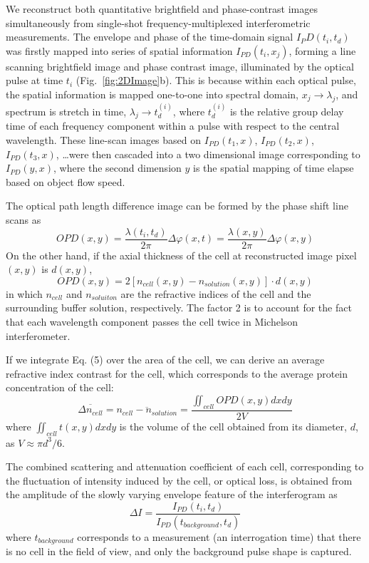\documentclass[aps,pra,reprint,superscriptaddress]{revtex4-1}
\begin{document}
We reconstruct both quantitative brightfield and phase-contrast images simultaneously from single-shot frequency-multiplexed interferometric measurements. The envelope and phase of the time-domain signal $I_PD (t_i,t_d)$ was firstly mapped into series of spatial information $I_{PD}(t_i,x_j)$, forming a line scanning brightfield image and phase contrast image, illuminated by the optical pulse at time $t_i$ (Fig.~\ref{fig:2DImage}b). This is because within each optical pulse, the spatial information is mapped one-to-one into spectral domain, $x_j \rightarrow \lambda_j$, and spectrum is stretch in time, $\lambda_j \rightarrow t_d^{(i)}$, where $t_d^{(i)}$ is the relative group delay time of each frequency component within a pulse with respect to the central wavelength. These line-scan images based on $I_{PD}(t_1,x)$, $I_{PD} (t_2,x)$, $I_{PD} (t_3,x)$, \ldots were then cascaded into a two dimensional image corresponding to $I_{PD}(y,x)$, where the second dimension $y$ is the spatial mapping of time elapse based on object flow speed. 

The optical path length difference image can be formed by the phase shift line scans as
\begin{equation}
OPD(x,y) = \frac{\lambda(t_i,t_d)}{2\pi} \Delta\varphi(x,t) = \frac{\lambda(x,y)}{2\pi} \Delta\varphi(x,y)
\end{equation}
On the other hand, if the axial thickness of the cell at reconstructed image pixel $(x,y)$ is $d(x,y)$,
\begin{equation}
OPD(x,y) = 2 [n_{cell}(x,y) - n_{solution}(x,y)] \cdot d(x,y)
\end{equation}
in which $n_{cell}$ and $n_{soluiton}$ are the refractive indices of the cell and the surrounding buffer solution, respectively. The factor 2 is to account for the fact that each wavelength component passes the cell twice in Michelson interferometer. 

If we integrate Eq. (5) over the area of the cell, we can derive an average refractive index contrast for the cell, which corresponds to the average protein concentration of the cell:
\begin{equation}
\overline{\Delta n_{cell}} = \overline{n_{cell} - n_{solution}} = \frac{\iint_{cell} OPD(x,y) dx dy}{2 V}
\end{equation}
where $\iint_{cell} t(x,y) dx dy$ is the volume of the cell obtained from its diameter, $d$, as $V \approx \pi d^3/6$. 

The combined scattering and attenuation coefficient of each cell, corresponding to the fluctuation of intensity induced by the cell, or optical loss, is obtained from the amplitude of the slowly varying envelope feature of the interferogram as
\begin{equation}
\Delta I = \frac{I_{PD}(t_i,t_d)}{I_{PD}(t_{background},t_d)}
\end{equation}
where $t_{background}$ corresponds to a measurement (an interrogation time) that there is no cell in the field of view, and only the background pulse shape is captured. 
\end{document}
